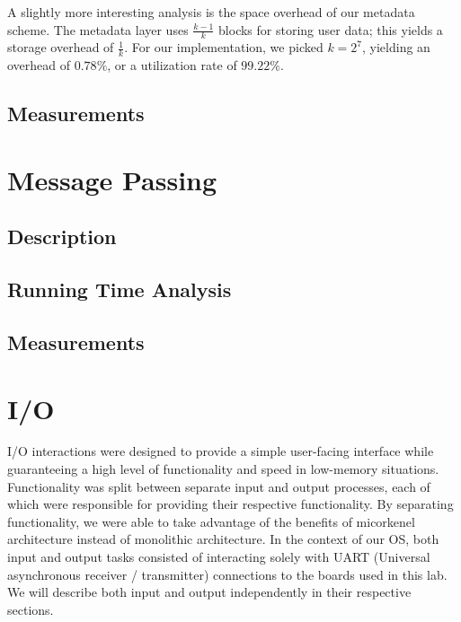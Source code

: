 \documentclass[12pt]{report}
\begin{document}
    A slightly more interesting analysis is the space overhead of our metadata
    scheme. The metadata layer uses $\frac{k-1}{k}$ blocks for storing user
    data; this yields a storage overhead of $\frac{1}{k}$. For our
    implementation, we picked $k=2^7$, yielding an overhead of $0.78\%$, or a
    utilization rate of $99.22\%$.

\section{Measurements}

\chapter{Message Passing}

\section{Description}

\section{Running Time Analysis}

\section{Measurements}

\chapter{I/O}

    I/O interactions were designed to provide a simple user-facing interface
    while guaranteeing a high level of functionality and speed in low-memory
    situations. Functionality was split between separate input and output
    processes, each of which were responsible for providing their respective
    functionality. By separating functionality, we were able to take advantage
    of the benefits of micorkenel architecture instead of monolithic
    architecture.
    In the context of our OS, both input and output tasks consisted of %
    interacting solely with UART (Universal asynchronous receiver / transmitter)
    connections to the boards used in this lab. %
    We will describe both input and output independently in their respective
    sections.
\end{document}
